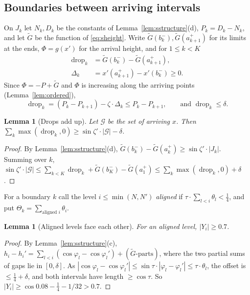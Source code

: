 \documentclass[11pt,letterpaper]{amsart}
\theoremstyle{plain}
\newtheorem{lemma}[theorem]{Lemma}
\theoremstyle{definition}
\theoremstyle{remark}
\begin{document}
\subsection{Boundaries between arriving intervals}
\leavevmode\par
On $J_k$ let $N_k,D_k$ be the constants of Lemma~\ref{lem:sstructure}(d), $P_k=D_k-N_k$, and let $\widetilde G$ be the function of \eqref{eq:sheight}. Write $\widetilde G(b_k^-),\widetilde G(a_{k+1}^+)$ for its limits at the ends, $\Phi=g(x')$ for the arrival height, and for $1\le k<K$
\[
\begin{aligned}
\operatorname{drop}_k&=\widetilde G(b_k^-)-\widetilde G(a_{k+1}^+),\\
\Delta_k&=x'(a_{k+1}^+)-x'(b_k^-)\ge0.
\end{aligned}
\]
Since $\Phi=-P+\widetilde G$ and $\Phi$ is increasing along the arriving points (Lemma~\ref{lem:ordered}),
\begin{equation}\label{eq:drops}
\operatorname{drop}_k=(P_k-P_{k+1})-\zeta\cdot\Delta_k\le P_k-P_{k+1},\qquad\text{and }\operatorname{drop}_k\le\delta.
\end{equation}

\begin{lemma}[Drops add up]\label{lem:drops}
Let $\mathcal G$ be the set of arriving $x$. Then $\sum_k\max(\operatorname{drop}_k,0)\ge\sin\zeta'\cdot|\mathcal G|-\delta$.
\end{lemma}
\begin{proof}
By Lemma~\ref{lem:sstructure}(d), $\widetilde G(b_k^-)-\widetilde G(a_k^+)\ge\sin\zeta'\cdot|J_k|$. Summing over $k$, $\sin\zeta'\cdot|\mathcal G|\le\sum_{k<K}\operatorname{drop}_k+\widetilde G(b_K^-)-\widetilde G(a_1^+)\le\sum_k\max(\operatorname{drop}_k,0)+\delta$.
\end{proof}

For a boundary $k$ call the level $i\le\min(N,N')$ \emph{aligned} if $\tau\cdot\sum_{l<i}\theta_l<\tfrac14$, and put $\Theta_k=\sum_{\text{aligned }i}\theta_i$.

\begin{lemma}[Aligned levels face each other]\label{lem:aligned}
For an aligned level, $|Y_i|\ge0.7$.
\end{lemma}
\begin{proof}
By Lemma~\ref{lem:sstructure}(c), $h_i-h_i'=\sum_{l<i}(\cos\varphi_l-\cos\varphi_l')+(\widetilde G\text{-parts})$, where the two partial sums of gaps lie in $[0,\delta]$. As $|\cos\varphi_l-\cos\varphi_l'|\le\sin\tau\cdot|\varphi_l-\varphi_l'|\le\tau\cdot\theta_l$, the offset is $\le\tfrac14+\delta$, and both intervals have length $\ge\cos\tau$. So $|Y_i|\ge\cos0.08-\tfrac14-1/32>0.7$.
\end{proof}
\end{document}

